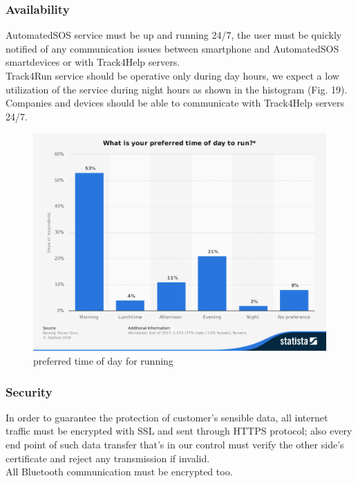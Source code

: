 \documentclass[../main.tex]{subfiles}
\begin{document}
\subsubsection{Availability}


	AutomatedSOS service must be up and running 24/7, the user must be quickly notified of 
	any communication issues between smartphone and AutomatedSOS smartdevices or with Track4Help servers.\\
	Track4Run service should be operative only during day hours, we expect a low utilization of the service during night hours as shown
	in the histogram (Fig. 19).\\
	Companies and devices should be able to communicate with Track4Help servers 24/7.
	 
\begin{figure}[H]
	\center
	\includegraphics[scale=0.35]{images/runhours.png}
	\caption{preferred time of day for running}
\end{figure}	
		


\subsubsection{Security}

In order to guarantee the protection of customer's sensible data, all internet traffic must be encrypted with SSL and sent through HTTPS protocol; also every end point of such data transfer that's in our control must verify the other side's certificate and reject any transmission if invalid.\\
All Bluetooth communication must be encrypted too.\\
\end{document}
